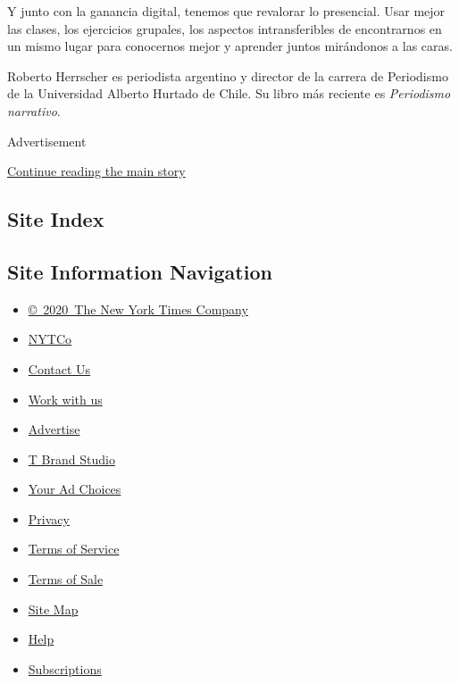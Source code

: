 Y junto con la ganancia digital, tenemos que revalorar lo presencial.
Usar mejor las clases, los ejercicios grupales, los aspectos
intransferibles de encontrarnos en un mismo lugar para conocernos mejor
y aprender juntos mirándonos a las caras.

Roberto Herrscher es periodista argentino y director de la carrera de
Periodismo de la Universidad Alberto Hurtado de Chile. Su libro más
reciente es \emph{Periodismo narrativo}.

Advertisement

\protect\hyperlink{after-bottom}{Continue reading the main story}

\hypertarget{site-index}{%
\subsection{Site Index}\label{site-index}}

\hypertarget{site-information-navigation}{%
\subsection{Site Information
Navigation}\label{site-information-navigation}}

\begin{itemize}
\tightlist
\item
  \href{https://help.nytimes.com/hc/en-us/articles/115014792127-Copyright-notice}{©~2020~The
  New York Times Company}
\end{itemize}

\begin{itemize}
\tightlist
\item
  \href{https://www.nytco.com/}{NYTCo}
\item
  \href{https://help.nytimes.com/hc/en-us/articles/115015385887-Contact-Us}{Contact
  Us}
\item
  \href{https://www.nytco.com/careers/}{Work with us}
\item
  \href{https://nytmediakit.com/}{Advertise}
\item
  \href{http://www.tbrandstudio.com/}{T Brand Studio}
\item
  \href{https://www.nytimes.com/privacy/cookie-policy\#how-do-i-manage-trackers}{Your
  Ad Choices}
\item
  \href{https://www.nytimes.com/privacy}{Privacy}
\item
  \href{https://help.nytimes.com/hc/en-us/articles/115014893428-Terms-of-service}{Terms
  of Service}
\item
  \href{https://help.nytimes.com/hc/en-us/articles/115014893968-Terms-of-sale}{Terms
  of Sale}
\item
  \href{https://spiderbites.nytimes.com}{Site Map}
\item
  \href{https://help.nytimes.com/hc/en-us}{Help}
\item
  \href{https://www.nytimes.com/subscription?campaignId=37WXW}{Subscriptions}
\end{itemize}
